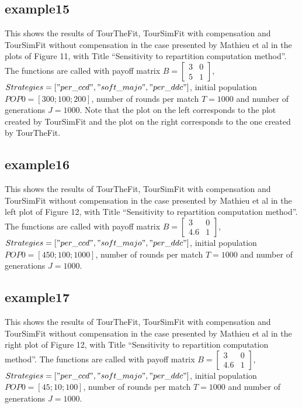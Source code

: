 \subsection{example15}
This shows the results of TourTheFit, TourSimFit with compensation and TourSimFit without compensation in the case presented by Mathieu et al in the plots of Figure 11, with Title ``Sensitivity to repartition computation method''. The functions are called with payoff matrix $B = \begin{bmatrix} 3 & 0 \\ 5 & 1 \end{bmatrix}$, $Strategies = ["per\_ccd", \- "soft\_majo", "per\_ddc"]$, initial population $POP0 = [300; 100; 200]$, number of rounds per match $T = 1000$ and number of generations $J = 1000$. Note that the plot on the left corresponds to the plot created by TourSimFit and the plot on the right corresponds to the one created by TourTheFit.

\subsection{example16}
This shows the results of TourTheFit, TourSimFit with compensation and TourSimFit without compensation in the case presented by Mathieu et al in the left plot of Figure 12, with Title ``Sensitivity to repartition computation method''. The functions are called with payoff matrix $B = \begin{bmatrix} 3 & 0 \\ 4.6 & 1 \end{bmatrix}$, $Strategies = ["per\_ccd", "soft\_majo", "per\_ddc"]$, initial population $POP0 = [450; 100; 1000]$, number of rounds per match $T = 1000$ and number of generations $J = 1000$.

\subsection{example17}
This shows the results of TourTheFit, TourSimFit with compensation and TourSimFit without compensation in the case presented by Mathieu et al in the right plot of Figure 12, with Title ``Sensitivity to repartition computation method''. The functions are called with payoff matrix $B = \begin{bmatrix} 3 & 0 \\ 4.6 & 1 \end{bmatrix}$, $Strategies = ["per\_ccd", "soft\_majo", "per\_ddc"]$, initial population $POP0 = [45; 10; 100]$, number of rounds per match $T = 1000$ and number of generations $J = 1000$.

